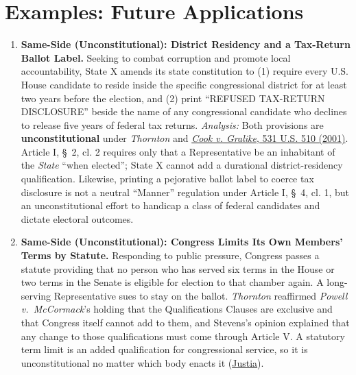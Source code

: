 \documentclass[12pt]{article}
\begin{document}
\section{Examples: Future Applications}
\begin{enumerate}

\item \textbf{Same-Side (Unconstitutional): District Residency and a Tax-Return Ballot Label.} Seeking to combat corruption and promote local accountability, State X amends its state constitution to (1) require every U.S. House candidate to reside inside the specific congressional district for at least two years before the election, and (2) print ``REFUSED TAX-RETURN DISCLOSURE'' beside the name of any congressional candidate who declines to release five years of federal tax returns. \textit{Analysis:} Both provisions are \textbf{unconstitutional} under \textit{Thornton} and \href{https://supreme.justia.com/cases/federal/us/531/510/}{\textit{Cook v. Gralike}, 531 U.S. 510 (2001)}. Article I, \S~2, cl. 2 requires only that a Representative be an inhabitant of the \textit{State} ``when elected''; State X cannot add a durational district-residency qualification. Likewise, printing a pejorative ballot label to coerce tax disclosure is not a neutral ``Manner'' regulation under Article I, \S~4, cl. 1, but an unconstitutional effort to handicap a class of federal candidates and dictate electoral outcomes.

\item \textbf{Same-Side (Unconstitutional): Congress Limits Its Own Members' Terms by Statute.} Responding to public pressure, Congress passes a statute providing that no person who has served six terms in the House or two terms in the Senate is eligible for election to that chamber again. A long-serving Representative sues to stay on the ballot. \textit{Thornton} reaffirmed \textit{Powell v.\ McCormack}'s holding that the Qualifications Clauses are exclusive and that Congress itself cannot add to them, and Stevens's opinion explained that any change to those qualifications must come through Article V. A statutory term limit is an added qualification for congressional service, so it is unconstitutional no matter which body enacts it (\href{https://supreme.justia.com/cases/federal/us/514/779/}{Justia}).


\end{enumerate}
\end{document}
